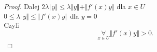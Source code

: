\documentclass[../main.tex]{subfiles}
\begin{document}
\begin{proof}
Dalej $2\lambda \Vert y \Vert \le \lambda \Vert y \Vert + \Vert f'(x) y \Vert $ dla $x\in U$ \\
$0 \le \lambda \Vert y \Vert \le \Vert f'(x) y \Vert $ dla $y = 0$ \\
Czyli \[
    \underset{x\in U}{\forall} \Vert f'(x) y \Vert > 0
.\]
\end{proof}
\end{document}
